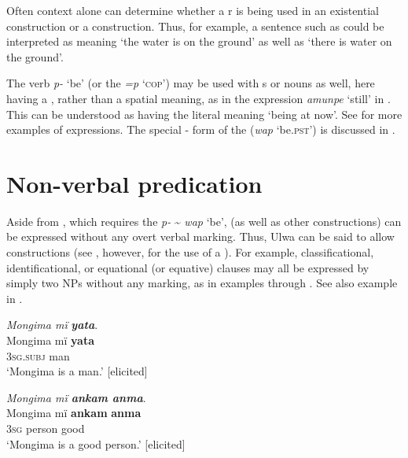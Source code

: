 Often context alone can determine whether a r  is being used in an existential construction or a  construction. Thus, for example, a sentence such as  could be interpreted as meaning ‘the water is on the ground’ as well as ‘there is water on the ground’.

  The verb \textit{p-} ‘be’ (or the  \textit{=p} ‘\textsc{cop}’) may be used with s or nouns as well, here having a , rather than a spatial meaning, as in the expression \textit{amunpe} ‘still’ in . This can be understood as having the literal meaning ‘being at now’. See  for more examples of  expressions. The special - form of the  (\textit{wap} ‘be.\textsc{pst}’) is discussed in .


\section{Non-verbal predication}\label{sec:10.2}


Aside from , which requires the  \textit{p-} {\textasciitilde} \textit{wap} ‘be’,  (as well as other  constructions) can be expressed without any overt verbal marking. Thus, Ulwa can be said to allow  constructions (see , however, for the use of a ). For example,  classificational,   identificational, or  equational (or  equative) clauses may all be expressed by simply  two NPs without any marking, as in examples  through . See also example  in .

\ea%
    \label{ex:pred:22}
          \textit{Mongima mï} \textbf{\textit{yata}}.\\
\gll Mongima  mï      \textbf{yata}\\
    [name]    3\textsc{sg.subj}  man\\
\glt `Mongima is a man.’ [elicited]
\z

\ea%
    \label{ex:pred:23}
          \textit{Mongima mï \textbf{ankam anma}}.\\
\gll Mongima  mï    \textbf{ankam}    \textbf{anma}\\
    [name]    3\textsc{sg}  person    good\\
\glt `Mongima is a good person.’ [elicited]
\z

